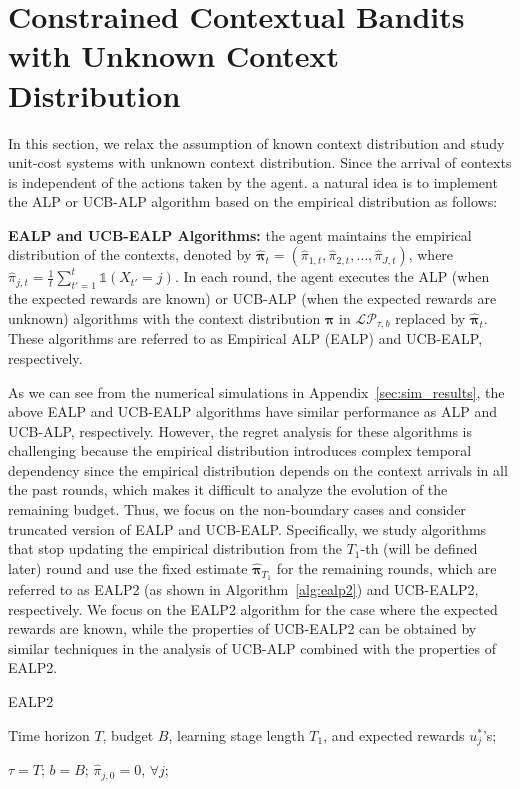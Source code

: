 \section{Constrained Contextual Bandits with Unknown Context Distribution} \label{app:unknown_dist}
In this section, we relax the assumption of known context distribution and study unit-cost systems with unknown context distribution. Since the arrival of contexts is independent of the actions taken by the agent.
a natural idea is to implement the ALP or UCB-ALP algorithm based on the empirical distribution as follows:

\textbf{EALP and UCB-EALP Algorithms:} the agent maintains  the empirical distribution of the contexts, denoted by $\hat{\boldsymbol{\pi}}_t = (\hat{\pi}_{1,t}, \hat{\pi}_{2,t}, \ldots, \hat{\pi}_{J,t})$, where $\hat{\pi}_{j,t} = \frac{1}{t}\sum_{t' = 1}^t \mathds{1}(X_{t'} = j)$. In each round, the agent executes the ALP (when the expected rewards are known) or UCB-ALP (when the expected rewards are unknown) algorithms with the context distribution $\boldsymbol{\pi}$ in $\mathcal{LP}_{\tau, b}$ replaced by $\hat{\boldsymbol{\pi}}_t$. These algorithms are referred to as Empirical ALP (EALP) and UCB-EALP, respectively.

As we can see from the numerical simulations in Appendix~\ref{sec:sim_results}, the above EALP and UCB-EALP algorithms have similar performance as ALP and UCB-ALP, respectively. However, the regret analysis for these algorithms is challenging because the empirical distribution introduces complex temporal dependency since the empirical distribution depends on the context arrivals in all the past rounds, which makes it difficult to analyze the evolution of the remaining budget. Thus, we focus on the non-boundary cases and consider truncated version of EALP and UCB-EALP. Specifically, we study algorithms that stop updating the empirical distribution from the $T_1$-th (will be defined later) round and use the fixed estimate $\hat{\boldsymbol{\pi}}_{T_1}$ for the remaining rounds, which are  referred to as EALP2 (as shown in Algorithm~\ref{alg:ealp2}) and UCB-EALP2, respectively. We focus on the EALP2 algorithm for the case where the expected rewards are known, while the properties of UCB-EALP2 can be obtained by similar techniques in the analysis of UCB-ALP combined with the properties of EALP2.
\begin{algorithm}[htbp]
\caption{EALP2}
\label{alg:ealp2}
\begin{algorithmic}
 Time horizon $T$, budget $B$, learning stage length $T_1$, and expected rewards $u_j^*$'s;

 $\tau = T$; $b = B$; $\hat{\pi}_{j,0} = 0$, $\forall j$;

\ENDIF
{}
\ENDIF
\ENDFOR
\end{algorithmic}
\end{algorithm}

